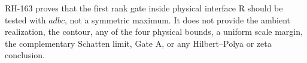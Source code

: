 \documentclass[12pt]{article}
\begin{document}
RH-163 proves that the first rank gate inside physical interface R should be
tested with $adbc$, not a symmetric maximum.  It does not provide the
ambient realization, the contour, any of the four physical bounds, a
uniform scale margin, the complementary Schatten limit, Gate A, or any
Hilbert--Polya or zeta conclusion.



\end{document}
